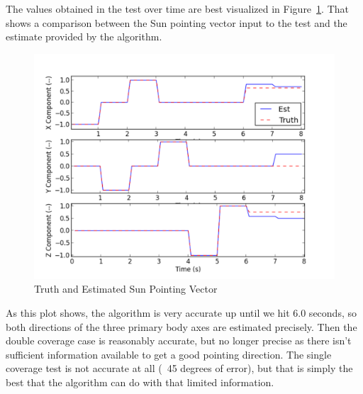 \documentclass[]{BasiliskReportMemo}
\begin{document}
The values obtained in the test over time are best visualized in 
Figure~\ref{fig:point_fig}.  That shows a comparison between the Sun pointing 
vector input to the test and the estimate provided by the algorithm.
\begin{figure}[htb]
        \centerline{
        \includegraphics[scale=0.5]{Figures/sunEstAccuracy}
        }
        \caption{Truth and Estimated Sun Pointing Vector}
        \label{fig:point_fig}
\end{figure}

As this plot shows, the algorithm is very accurate up until we hit 6.0 seconds, 
so both directions of the three primary body axes are estimated precisely.  
Then the double coverage case is reasonably accurate, but no longer precise as 
there isn't sufficient information available to get a good pointing direction.  
The single coverage test is not accurate at all (~45 degrees of error), but that 
is simply the best that the algorithm can do with that limited information.
\end{document}
